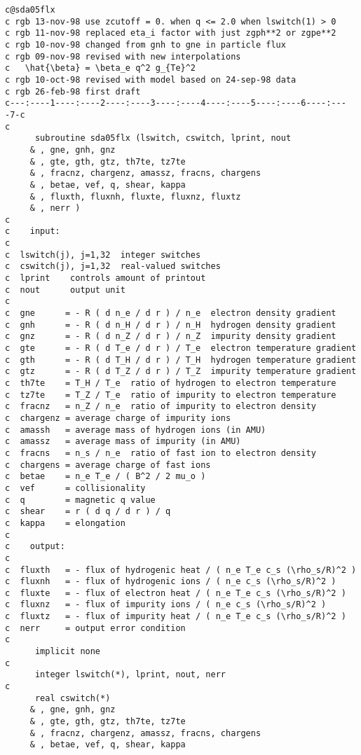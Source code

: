\begin{verbatim}
c@sda05flx
c rgb 13-nov-98 use zcutoff = 0. when q <= 2.0 when lswitch(1) > 0
c rgb 11-nov-98 replaced eta_i factor with just zgph**2 or zgpe**2
c rgb 10-nov-98 changed from gnh to gne in particle flux
c rgb 09-nov-98 revised with new interpolations
c   \hat{\beta} = \beta_e q^2 g_{Te}^2
c rgb 10-oct-98 revised with model based on 24-sep-98 data
c rgb 26-feb-98 first draft
c---:----1----:----2----:----3----:----4----:----5----:----6----:----7-c
c
      subroutine sda05flx (lswitch, cswitch, lprint, nout
     & , gne, gnh, gnz
     & , gte, gth, gtz, th7te, tz7te
     & , fracnz, chargenz, amassz, fracns, chargens
     & , betae, vef, q, shear, kappa
     & , fluxth, fluxnh, fluxte, fluxnz, fluxtz
     & , nerr )
c
c    input:
c
c  lswitch(j), j=1,32  integer switches
c  cswitch(j), j=1,32  real-valued switches
c  lprint    controls amount of printout
c  nout      output unit
c
c  gne      = - R ( d n_e / d r ) / n_e  electron density gradient
c  gnh      = - R ( d n_H / d r ) / n_H  hydrogen density gradient
c  gnz      = - R ( d n_Z / d r ) / n_Z  impurity density gradient
c  gte      = - R ( d T_e / d r ) / T_e  electron temperature gradient
c  gth      = - R ( d T_H / d r ) / T_H  hydrogen temperature gradient
c  gtz      = - R ( d T_Z / d r ) / T_Z  impurity temperature gradient
c  th7te    = T_H / T_e  ratio of hydrogen to electron temperature
c  tz7te    = T_Z / T_e  ratio of impurity to electron temperature
c  fracnz   = n_Z / n_e  ratio of impurity to electron density
c  chargenz = average charge of impurity ions
c  amassh   = average mass of hydrogen ions (in AMU)
c  amassz   = average mass of impurity (in AMU)
c  fracns   = n_s / n_e  ratio of fast ion to electron density
c  chargens = average charge of fast ions
c  betae    = n_e T_e / ( B^2 / 2 mu_o )
c  vef      = collisionality
c  q        = magnetic q value
c  shear    = r ( d q / d r ) / q
c  kappa    = elongation
c
c    output:
c
c  fluxth   = - flux of hydrogenic heat / ( n_e T_e c_s (\rho_s/R)^2 )
c  fluxnh   = - flux of hydrogenic ions / ( n_e c_s (\rho_s/R)^2 )
c  fluxte   = - flux of electron heat / ( n_e T_e c_s (\rho_s/R)^2 )
c  fluxnz   = - flux of impurity ions / ( n_e c_s (\rho_s/R)^2 )
c  fluxtz   = - flux of impurity heat / ( n_e T_e c_s (\rho_s/R)^2 )
c  nerr     = output error condition
c
      implicit none
c
      integer lswitch(*), lprint, nout, nerr
c
      real cswitch(*) 
     & , gne, gnh, gnz
     & , gte, gth, gtz, th7te, tz7te
     & , fracnz, chargenz, amassz, fracns, chargens
     & , betae, vef, q, shear, kappa

\end{verbatim}

